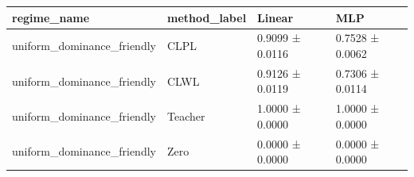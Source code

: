 \begin{tabular}{llll}
\toprule
regime_name & method_label & Linear & MLP \\
\midrule
uniform_dominance_friendly & CLPL & 0.9099 ± 0.0116 & 0.7528 ± 0.0062 \\
uniform_dominance_friendly & CLWL & 0.9126 ± 0.0119 & 0.7306 ± 0.0114 \\
uniform_dominance_friendly & Teacher & 1.0000 ± 0.0000 & 1.0000 ± 0.0000 \\
uniform_dominance_friendly & Zero & 0.0000 ± 0.0000 & 0.0000 ± 0.0000 \\
\bottomrule
\end{tabular}


